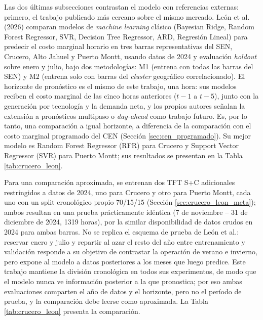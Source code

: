 Las dos últimas subsecciones contrastan el modelo con referencias externas: primero, el trabajo publicado más cercano sobre el mismo mercado. León et al. (2026) \cite{LeonSMPChile} comparan modelos de \textit{machine learning} clásico (Bayesian Ridge, Random Forest Regressor, SVR, Decision Tree Regressor, ARD, Regresión Lineal) para predecir el costo marginal horario en tres barras representativas del SEN, Crucero, Alto Jahuel y Puerto Montt, usando datos de 2024 y evaluación \textit{holdout} sobre enero y julio, bajo dos metodologías: M1 (entrena con todas las barras del SEN) y M2 (entrena solo con barras del \textit{cluster} geográfico correlacionado). El horizonte de pronóstico es el mismo de este trabajo, una hora: sus modelos reciben el costo marginal de las cinco horas anteriores ($t-1$ a $t-5$), junto con la generación por tecnología y la demanda neta, y los propios autores señalan la extensión a pronósticos multipaso o \textit{day-ahead} como trabajo futuro. Es, por lo tanto, una comparación a igual horizonte, a diferencia de la comparación con el costo marginal programado del CEN (Sección \ref{sec:cen_programado}). Su mejor modelo es Random Forest Regressor (RFR) para Crucero y Support Vector Regressor (SVR) para Puerto Montt; sus resultados se presentan en la Tabla \ref{tab:crucero_leon}.

Para una comparación aproximada, se entrenan dos TFT S+C adicionales restringidos a datos de 2024, uno para Crucero y otro para Puerto Montt, cada uno con un split cronológico propio 70/15/15 (Sección \ref{sec:crucero_leon_meta}); ambos resultan en una prueba prácticamente idéntica (7 de noviembre -- 31 de diciembre de 2024, 1319 horas), por la similar disponibilidad de datos crudos en 2024 para ambas barras. No se replica el esquema de prueba de León et al.: reservar enero y julio y repartir al azar el resto del año entre entrenamiento y validación responde a su objetivo de contrastar la operación de verano e invierno, pero expone al modelo a datos posteriores a los meses que luego predice. Este trabajo mantiene la división cronológica en todos sus experimentos, de modo que el modelo nunca ve información posterior a la que pronostica; por eso ambas evaluaciones comparten el año de datos y el horizonte, pero no el período de prueba, y la comparación debe leerse como aproximada. La Tabla \ref{tab:crucero_leon} presenta la comparación.

